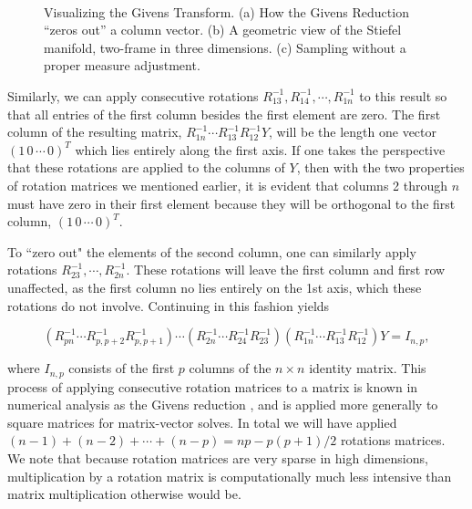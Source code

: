 \documentclass{article}
\begin{document}
\begin{figure}
\begin{subfigure}[b]{0.3\textwidth}
        \caption{}
        \label{fig:StiefelGeom}
    \end{subfigure}
    ~ %
    \begin{subfigure}[b]{0.3\textwidth}
        \caption{}
        \label{fig:AreaForm}
    \end{subfigure}
    \caption{Visualizing the Givens Transform. (a) How the Givens Reduction ``zeros out'' a column vector. (b) A geometric view of the Stiefel manifold, two-frame in three dimensions. (c) Sampling without a proper measure adjustment.}\label{fig:Givens}
\end{figure}

Similarly, we can apply consecutive rotations $R_{13}^{-1}, R_{14}^{-1}, \cdots, R_{1n}^{-1}$ to this result so that all entries of the first column besides the first element are zero. The first column of the resulting matrix, $R_{1n}^{-1} \cdots R_{13}^{-1}  R_{12}^{-1}Y$, will be the length one vector $(1 \, 0 \, \cdots \, 0)^T$ which lies entirely along the first axis. If one takes the perspective that these rotations are applied to the columns of $Y$, then with the two properties of rotation matrices we mentioned earlier, it is evident that columns 2 through $n$ must have zero in their first element because they will be orthogonal to the first column, $(1 \, 0 \, \cdots \, 0)^T$.

To ``zero out" the elements of the second column, one can similarly apply rotations $R_{23}^{-1}, \cdots, R_{2n}^{-1}$. These rotations will leave the first column and first row unaffected, as the first column no lies entirely on the 1st axis, which these rotations do not involve. Continuing in this fashion yields

\begin{equation}
\label{eq:GivensReduction}
(R_{pn}^{-1} \cdots R_{p,p+2}^{-1} R_{p,p+1}^{-1}) \cdots (R_{2n}^{-1} \cdots R_{24}^{-1} R_{23}^{-1})(R_{1n}^{-1} \cdots R_{13}^{-1}  R_{12}^{-1})Y = I_{n,p},
\end{equation}

where $I_{n,p}$ consists of the first $p$ columns of the $n \times n$ identity matrix. This process of applying consecutive rotation matrices to a matrix is known in numerical analysis as the Givens reduction \citep{meyer2000matrix}, and is applied more generally to square matrices for matrix-vector solves. In total we will have applied $(n-1)+(n-2)+\cdots+(n-p) = np -p(p+1)/2$ rotations matrices. We note that because rotation matrices are very sparse in high dimensions, multiplication by a rotation matrix is computationally much less intensive than matrix multiplication otherwise would be.
\end{document}
